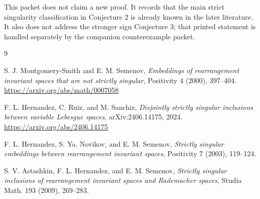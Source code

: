 \documentclass[11pt]{article}
\begin{document}
This packet does not claim a new proof. It records that the main strict
singularity classification in Conjecture 2 is already known in the later
literature. It also does not address the stronger sign Conjecture 3; that
printed statement is handled separately by the companion counterexample packet.

\begin{thebibliography}{9}

S. J. Montgomery-Smith and E. M. Semenov,
\emph{Embeddings of rearrangement invariant spaces that are not strictly
singular}, Positivity 4 (2000), 397--404.
\url{https://arxiv.org/abs/math/0007058}

F. L. Hernandez, C. Ruiz, and M. Sanchiz,
\emph{Disjointly strictly singular inclusions between variable Lebesgue
spaces}, arXiv:2406.14175, 2024.
\url{https://arxiv.org/abs/2406.14175}

F. L. Hernandez, S. Ya. Novikov, and E. M. Semenov,
\emph{Strictly singular embeddings between rearrangement invariant spaces},
Positivity 7 (2003), 119--124.

S. V. Astashkin, F. L. Hernandez, and E. M. Semenov,
\emph{Strictly singular inclusions of rearrangement invariant spaces and
Rademacher spaces}, Studia Math. 193 (2009), 269--283.

\end{thebibliography}
\end{document}
